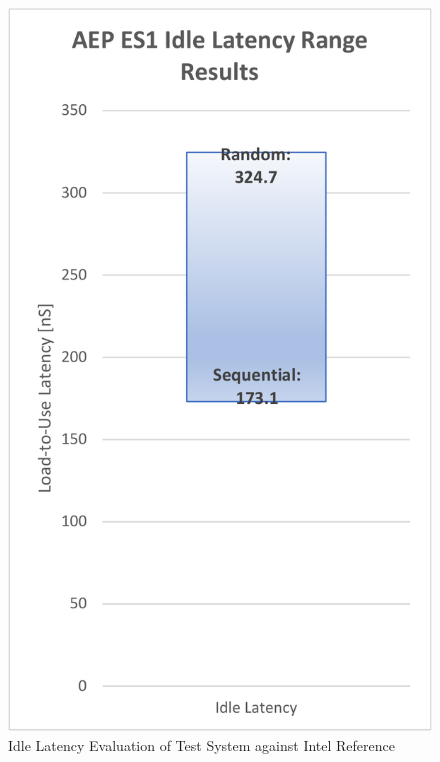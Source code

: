 \begin{figure}
    \centering
    \caption{Idle Latency Evaluation of Test System against Intel Reference}\label{chart:aep:idle}
    \includegraphics[scale=0.5]{charts/aep_eval_idle_latency-crop.pdf}
\end{figure}

